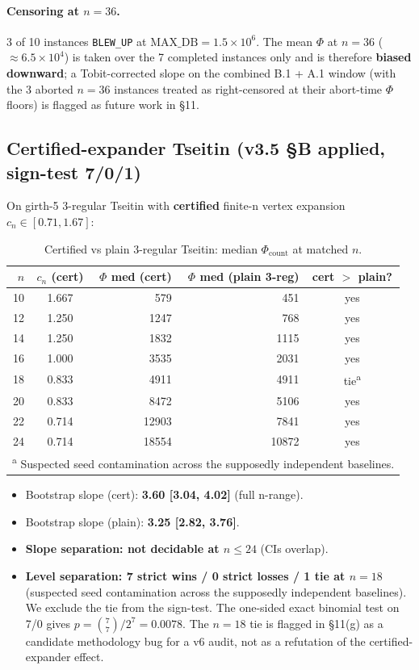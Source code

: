 \documentclass[11pt,a4paper]{article}
\theoremstyle{remark}
\begin{document}
\paragraph{Censoring at $n = 36$.} 3 of 10 instances \texttt{BLEW\_UP} at
$\mathrm{MAX\_DB} = 1.5 \times 10^6$. The mean $\Phi$ at $n=36$
($\approx 6.5 \times 10^4$) is taken over the 7 completed instances only
and is therefore \textbf{biased downward}; a Tobit-corrected slope on the
combined B.1 + A.1 window (with the 3 aborted $n=36$ instances treated
as right-censored at their abort-time $\Phi$ floors) is flagged as future
work in \S11.

\subsection{Certified-expander Tseitin (v3.5 \S B applied, sign-test 7/0/1)}

On girth-5 3-regular Tseitin with \textbf{certified} finite-n vertex
expansion $c_n \in [0.71, 1.67]$:

\begin{table}[H]
\centering
\small
\begin{tabular}{@{}rcrrc@{}}
\toprule
$n$ & $c_n$ (cert) & $\Phi$ med (cert) & $\Phi$ med (plain 3-reg) &
cert $>$ plain? \\
\midrule
10 & 1.667 & 579 & 451 & yes \\
12 & 1.250 & 1247 & 768 & yes \\
14 & 1.250 & 1832 & 1115 & yes \\
16 & 1.000 & 3535 & 2031 & yes \\
18 & 0.833 & 4911 & 4911 & tie\textsuperscript{a} \\
20 & 0.833 & 8472 & 5106 & yes \\
22 & 0.714 & 12903 & 7841 & yes \\
24 & 0.714 & 18554 & 10872 & yes \\
\multicolumn{5}{l}{\footnotesize\textsuperscript{a} Suspected seed contamination across the supposedly independent baselines.} \\
\bottomrule
\end{tabular}
\caption{Certified vs plain 3-regular Tseitin: median $\Phi_{\mathrm{count}}$ at matched $n$.}
\label{tab:cert-vs-plain}
\end{table}

\begin{itemize}
\item Bootstrap slope (cert): \textbf{3.60 [3.04, 4.02]} (full n-range).
\item Bootstrap slope (plain): \textbf{3.25 [2.82, 3.76]}.
\item \textbf{Slope separation: not decidable at $n \le 24$} (CIs overlap).
\item \textbf{Level separation: 7 strict wins / 0 strict losses / 1 tie
at $n=18$} (suspected seed contamination across the supposedly independent
baselines). We exclude the tie from the sign-test. The one-sided exact
binomial test on 7/0 gives $p = \binom{7}{7}/2^7 = 0.0078$. The $n=18$
tie is flagged in \S11(g) as a candidate methodology bug for a v6 audit,
not as a refutation of the certified-expander effect.
\end{itemize}
\end{document}
